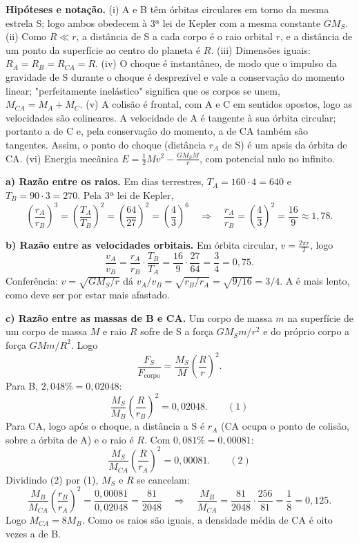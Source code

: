 \documentclass{article}%
\begin{document}
\noindent\textbf{Hipóteses e notação.} (i) A e B têm órbitas circulares em torno da mesma estrela S; logo ambos obedecem à 3ª lei de Kepler com a mesma constante $GM_S$. (ii) Como $R \ll r$, a distância de S a cada corpo é o raio orbital $r$, e a distância de um ponto da superfície ao centro do planeta é $R$. (iii) Dimensões iguais: $R_A = R_B = R_{CA} = R$. (iv) O choque é instantâneo, de modo que o impulso da gravidade de S durante o choque é desprezível e vale a conservação do momento linear; "perfeitamente inelástico" significa que os corpos se unem, $M_{CA} = M_A + M_C$. (v) A colisão é frontal, com A e C em sentidos opostos, logo as velocidades são colineares. A velocidade de A é tangente à sua órbita circular; portanto a de C e, pela conservação do momento, a de CA também são tangentes. Assim, o ponto do choque (distância $r_A$ de S) é um apsis da órbita de CA. (vi) Energia mecânica $E = \frac{1}{2}Mv^2 - \frac{GM_SM}{r}$, com potencial nulo no infinito.

\noindent\textbf{a) Razão entre os raios.} Em dias terrestres, $T_A = 160\cdot 4 = 640$ e $T_B = 90\cdot 3 = 270$. Pela 3ª lei de Kepler,
\[
\left(\frac{r_A}{r_B}\right)^3 = \left(\frac{T_A}{T_B}\right)^2 = \left(\frac{64}{27}\right)^2 = \left(\frac{4}{3}\right)^6 \quad\Rightarrow\quad \frac{r_A}{r_B} = \left(\frac{4}{3}\right)^2 = \frac{16}{9} \approx 1{,}78.
\]

\noindent\textbf{b) Razão entre as velocidades orbitais.} Em órbita circular, $v = \frac{2\pi r}{T}$, logo
\[
\frac{v_A}{v_B} = \frac{r_A}{r_B}\cdot\frac{T_B}{T_A} = \frac{16}{9}\cdot\frac{27}{64} = \frac{3}{4} = 0{,}75.
\]
Conferência: $v = \sqrt{GM_S/r}$ dá $v_A/v_B = \sqrt{r_B/r_A} = \sqrt{9/16} = 3/4$. A é mais lento, como deve ser por estar mais afastado.

\noindent\textbf{c) Razão entre as massas de B e CA.} Um corpo de massa $m$ na superfície de um corpo de massa $M$ e raio $R$ sofre de S a força $GM_Sm/r^2$ e do próprio corpo a força $GMm/R^2$. Logo
\[
\frac{F_S}{F_{\text{corpo}}} = \frac{M_S}{M}\left(\frac{R}{r}\right)^2.
\]
Para B, $2{,}048\% = 0{,}02048$:
\[
\frac{M_S}{M_B}\left(\frac{R}{r_B}\right)^2 = 0{,}02048. \qquad (1)
\]
Para CA, logo após o choque, a distância a S é $r_A$ (CA ocupa o ponto de colisão, sobre a órbita de A) e o raio é $R$. Com $0{,}081\% = 0{,}00081$:
\[
\frac{M_S}{M_{CA}}\left(\frac{R}{r_A}\right)^2 = 0{,}00081. \qquad (2)
\]
Dividindo (2) por (1), $M_S$ e $R$ se cancelam:
\[
\frac{M_B}{M_{CA}}\left(\frac{r_B}{r_A}\right)^2 = \frac{0{,}00081}{0{,}02048} = \frac{81}{2048}
\quad\Rightarrow\quad
\frac{M_B}{M_{CA}} = \frac{81}{2048}\cdot\frac{256}{81} = \frac{1}{8} = 0{,}125.
\]
Logo $M_{CA} = 8M_B$. Como os raios são iguais, a densidade média de CA é oito vezes a de B.
\end{document}
